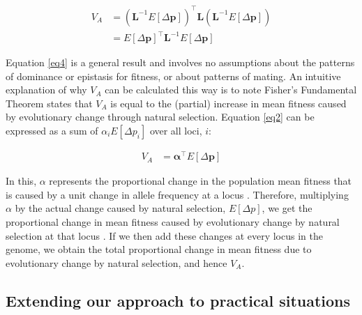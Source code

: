 \documentclass[12pt]{article}
\begin{document}
\begin{bibunit}
\begin{equation} \label{eq4}
\begin{array}{rl}
{V_A} &= \left({\textbf{L}^{-1}E[\Delta{\textbf{p}}]}\right)^{\top}{\textbf{L}}\left({\textbf{L}^{-1}E[\Delta{\textbf{p}}]}\right)\\
&= E[\Delta{\textbf{p}}]^{\top}{\textbf{L}^{-1}}E[\Delta{\textbf{p}}]
\end{array}
\end{equation}

Equation \ref{eq4} is a general result and involves no assumptions about the patterns of dominance or epistasis for fitness, or about patterns of mating. An intuitive explanation of why $V_A$ can be calculated this way is to note Fisher's Fundamental Theorem states that ${V_A}$ is equal to the (partial) increase in mean fitness caused by evolutionary change through natural selection. Equation \ref{eq2} can be expressed as a sum of $\alpha_i E[\Delta p_i]$ over all loci, $i$:

\begin{equation} \label{eq2b}
\begin{array}{rl}
{V_A} &= \boldsymbol{\alpha}^{\top}E[\Delta{\textbf{p}}]
\end{array}
\end{equation}

In this,  $\alpha$ represents the proportional change in the population mean fitness that is caused by a unit change in allele frequency at a locus \citep{Fisher.1941, Kojima.1959, Lee.2013}. Therefore, multiplying $\alpha$ by the actual change caused by natural selection, $E[\Delta p]$, we get the proportional change in mean fitness caused by evolutionary change by natural selection at that locus \citep[see Eq 51.4][also]{price1972fisher}. If we then add these changes at every locus in the genome, we obtain the total proportional change in mean fitness due to evolutionary change by natural selection, and hence $V_A$.  

\subsection*{Extending our approach to practical situations}



\end{bibunit}
\end{document}
